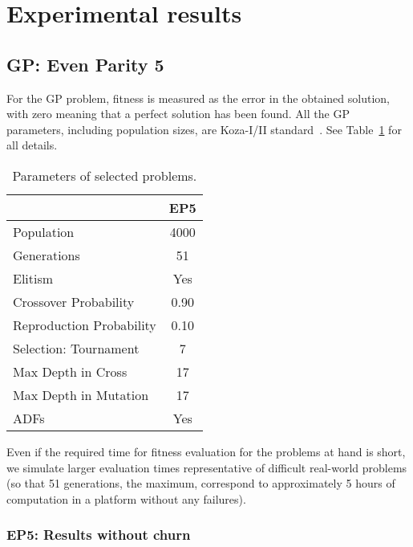 \documentclass[graybox]{sty/svmult}
\begin{document}
\section{Experimental results}
\label{experimentalresults}

\subsection{GP: Even Parity 5}

For the GP problem, fitness is measured as the error in the obtained solution, with zero meaning that a perfect solution has
been found. All the GP parameters, including population sizes, are
Koza-I/II standard~\cite{koza:book}.  See Table~\ref{tab:gp-parameters}
for all details.

\begin{table}
    \caption{Parameters of selected problems.}
    \begin{center}
\begin{tabular}{|l|c|}         
        \cline{2-2}
        \multicolumn{1}{c|}{} & EP5 \\
        \hline Population & 4000 \\
        \hline Generations & 51  \\
        \hline Elitism & Yes \\         
        \hline Crossover Probability & 0.90 \\         
        \hline Reproduction Probability & 0.10 \\
        \hline Selection: Tournament & 7 \\
        \hline Max Depth in Cross & 17 \\
        \hline Max Depth in Mutation & 17 \\
        \hline ADFs & Yes \\
        \hline     
    \end{tabular} 
\end{center}
\label{tab:gp-parameters} 
\end{table}

Even if the required time for fitness evaluation for
the problems at hand is short, we simulate larger evaluation times
representative of difficult real-world problems (so that 51 generations,
the maximum, correspond to approximately 5 hours of computation in a
platform without any failures).

\subsubsection{EP5: Results without churn}
\end{document}
